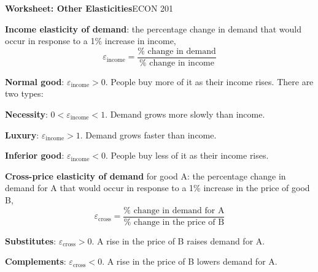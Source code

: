 \documentclass[11pt]{article}
\begin{document}
{\LARGE\bfseries\color{accent} Worksheet: Other Elasticities}\hfill{\large ECON 201}

\newcommand{\term}[1]{\textcolor{accentdark}{\textbf{#1}}}

\newenvironment{deflist}
  {\begin{list}{\textbullet}{%
     \setlength{\leftmargin}{1.1em}\setlength{\labelwidth}{0.7em}%
     \setlength{\labelsep}{0.4em}\setlength{\itemindent}{0pt}%
     \setlength{\listparindent}{0pt}\setlength{\topsep}{2pt}%
     \setlength{\partopsep}{0pt}\setlength{\parsep}{0pt}%
     \setlength{\itemsep}{2pt}}}
  {\end{list}}


\begin{tcolorbox}[colback=cream, colframe=accent, boxrule=0.6pt, arc=2pt,
  left=6pt, right=6pt, top=4pt, bottom=4pt, title=Definitions,
  fonttitle=\bfseries, coltitle=white]
\begin{deflist}
\item \term{Income elasticity of demand}: the percentage change in demand that
  would occur in response to a 1\% increase in income,
  \[
    \varepsilon_{\text{income}}
    = \frac{\%\text{ change in demand}}{\%\text{ change in income}}
  \]
  \begin{deflist}
  \item \term{Normal good}: $\varepsilon_{\text{income}} > 0$. People buy more
    of it as their income rises. There are two types:
    \begin{deflist}
    \item \term{Necessity}: $0 < \varepsilon_{\text{income}} < 1$. Demand grows
      more slowly than income.
    \item \term{Luxury}: $\varepsilon_{\text{income}} > 1$. Demand grows faster
      than income.
    \end{deflist}
  \item \term{Inferior good}: $\varepsilon_{\text{income}} < 0$. People buy less
    of it as their income rises.
  \end{deflist}
\item \term{Cross-price elasticity of demand} for good A: the percentage change
  in demand for A that would occur in response to a 1\% increase in the price
  of good B,
  \[
    \varepsilon_{\text{cross}}
    = \frac{\%\text{ change in demand for A}}{\%\text{ change in the price of B}}
  \]
  \begin{deflist}
  \item \term{Substitutes}: $\varepsilon_{\text{cross}} > 0$. A rise in the
    price of B raises demand for A.
  \item \term{Complements}: $\varepsilon_{\text{cross}} < 0$. A rise in the
    price of B lowers demand for A.
  \end{deflist}
\end{deflist}
\end{tcolorbox}
\end{document}
